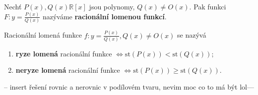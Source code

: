 \begin{definition}
    Nechť $P(x), Q(x) \mathbb R[x]$ jsou polynomy, $Q(x) \ne O(x).$
    Pak funkci $F:y=\frac{P(x)}{Q(x)}$ nazýváme \textbf{racionální
    lomenou funkcí}.
\end{definition}

\begin{definition}
    Racionální lomená funkce $f: y=\frac{P(x)}{Q(x)}, Q(x) \ne O(x)$
    se nazývá
    \begin{enumerate}[$i.$]
        \item \textbf{ryze lomená} racionální funkce
        $\iff \text{st}\left (P(x) \right ) <
        \text{st}\left (Q(x) \right )$;
       	\item \textbf{neryze lomená} racionální funkce
        $\iff \text{st}\left (P(x) \right ) \geq
        \text{st}\left (Q(x) \right )$.
    \end{enumerate}
\end{definition}


-- insert řešení rovnic a nerovnic v podílovém tvaru, nevim moc co to má být lol---

